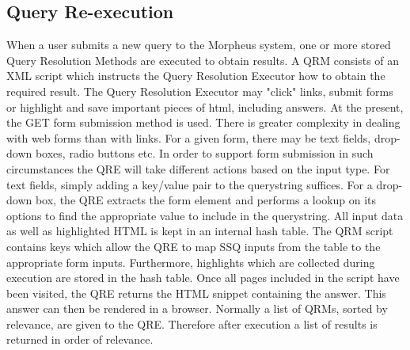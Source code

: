 \subsection{Query Re-execution}
When a user submits a new query to the Morpheus system, one or more
stored Query Resolution Methods are executed to obtain results. A QRM
consists of an XML script which instructs the Query Resolution
Executor how to obtain the required result. The Query Resolution
Executor may "click" links, submit forms or highlight and save
important pieces of html, including answers. At the present, the GET
form submission method is used.  There is greater complexity in
dealing with web forms than with links. For a given form, there may be
text fields, drop-down boxes, radio buttons etc. In order to support
form submission in such circumstances the QRE will take different
actions based on the input type. For text fields, simply adding a
key/value pair to the querystring suffices. For a drop-down box, the
QRE extracts the form element and performs a lookup on its options to
find the appropriate value to include in the querystring.  All input
data as well as highlighted HTML is kept in an internal hash
table. The QRM script contains keys which allow the QRE to map SSQ
inputs from the table to the appropriate form inputs. Furthermore,
highlights which are collected during execution are stored in the hash
table.  Once all pages included in the script have been visited, the
QRE returns the HTML snippet containing the answer. This answer can
then be rendered in a browser. Normally a list of QRMs, sorted by
relevance, are given to the QRE. Therefore after execution a list of
results is returned in order of relevance.
